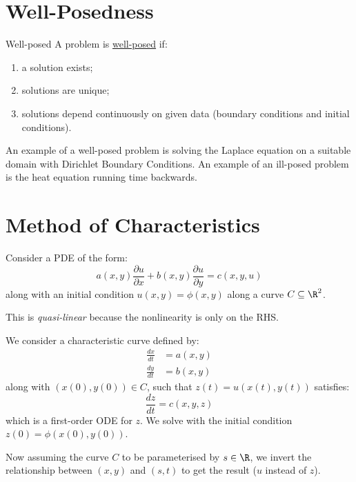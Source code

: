 \documentclass[../Main.tex]{subfiles}
\begin{document}
\section{Well-Posedness}
\begin{definition}{Well-posed}
    A problem is \underline{well-posed} if:
    \begin{enumerate}
        \item a solution exists;
        \item solutions are unique;
        \item solutions depend continuously on given data (boundary conditions and initial conditions).
    \end{enumerate}
\end{definition}
An example of a well-posed problem is solving the Laplace equation on a suitable domain with Dirichlet Boundary Conditions. An example of an ill-posed problem is the heat equation running time backwards.
\section{Method of Characteristics}
Consider a PDE of the form:
\begin{equation*}
    a(x, y) \frac{\partial u}{\partial x} + b(x, y) \frac{\partial u}{\partial y} = c(x, y, u)
\end{equation*}
along with an initial condition $u(x, y) = \phi(x, y)$ along a curve $C \subseteq \R^2$.

This is \textit{quasi-linear} because the nonlinearity is only on the RHS.

We consider a characteristic curve defined by:
\begin{align*}
    \frac{dx}{dt} &= a(x, y) \\
    \frac{dy}{dt} &= b(x, y)
\end{align*}
along with $(x(0), y(0)) \in C$, such that $z(t) = u(x(t), y(t))$ satisfies:
\begin{equation*}
    \frac{dz}{dt} = c(x, y, z)
\end{equation*}
which is a first-order ODE for $z$. We solve with the initial condition $z(0) = \phi(x(0), y(0))$.

Now assuming the curve $C$ to be parameterised by $s \in \R$, we invert the relationship between $(x, y)$ and $(s, t)$ to get the result ($u$ instead of $z$).
\end{document}
